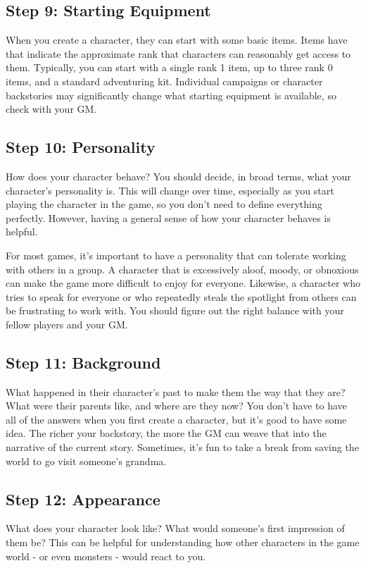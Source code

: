     \subsection{Step 9: Starting Equipment}
        When you create a character, they can start with some basic items.
        Items have  that indicate the approximate rank that characters can reasonably get access to them.
        Typically, you can start with a single rank 1 item, up to three rank 0 items, and a standard adventuring kit.
        Individual campaigns or character backstories may significantly change what starting equipment is available, so check with your GM.

    \subsection{Step 10: Personality}

        How does your character behave?
        You should decide, in broad terms, what your character's personality is.
        This will change over time, especially as you start playing the character in the game, so you don't need to define everything perfectly.
        However, having a general sense of how your character behaves is helpful.

        For most games, it's important to have a personality that can tolerate working with others in a group.
        A character that is excessively aloof, moody, or obnoxious can make the game more difficult to enjoy for everyone.
        Likewise, a character who tries to speak for everyone or who repeatedly steals the spotlight from others can be frustrating to work with.
        You should figure out the right balance with your fellow players and your GM.\@

    \subsection{Step 11: Background}
        What happened in their character's past to make them the way that they are?
        What were their parents like, and where are they now?
        You don't have to have all of the answers when you first create a character, but it's good to have some idea.
        The richer your backstory, the more the GM can weave that into the narrative of the current story.
        Sometimes, it's fun to take a break from saving the world to go visit someone's grandma.

    \subsection{Step 12: Appearance}
        What does your character look like?
        What would someone's first impression of them be?
        This can be helpful for understanding how other characters in the game world - or even monsters - would react to you.


